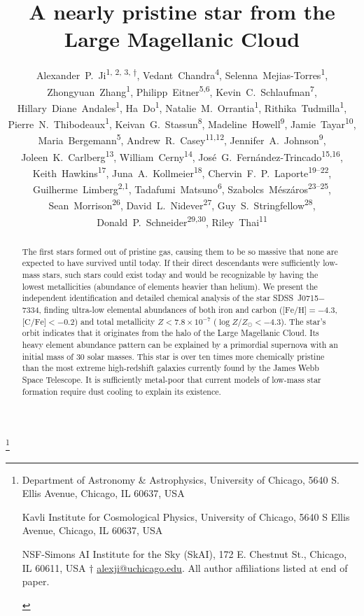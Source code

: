 \documentclass{natureprintstyle}
\title{A nearly pristine star from the Large Magellanic Cloud}
\author{Alexander~P.~Ji\textsuperscript{1, 2, 3, $\dagger$}, %
Vedant~Chandra\textsuperscript{4},                           %
Selenna~Mejias-Torres\textsuperscript{1},                    %
Zhongyuan~Zhang\textsuperscript{1},                          %
Philipp~Eitner\textsuperscript{5,6},                         %
Kevin~C.~Schlaufman\textsuperscript{7},                      %
Hillary~Diane~Andales\textsuperscript{1},                    %
Ha~Do\textsuperscript{1},                                    %
Natalie~M.~Orrantia\textsuperscript{1},                      %
Rithika~Tudmilla\textsuperscript{1},                         %
Pierre~N.~Thibodeaux\textsuperscript{1},                     %
Keivan~G.~Stassun\textsuperscript{8},                        %
Madeline~Howell\textsuperscript{9},                          %
Jamie~Tayar\textsuperscript{10},                             %
Maria~Bergemann\textsuperscript{5},                          %
Andrew~R.~Casey\textsuperscript{11,12},                      %
Jennifer~A.~Johnson\textsuperscript{9},                      %
Joleen~K.~Carlberg\textsuperscript{13},                      %
William~Cerny\textsuperscript{14},                           %
Jos\'e~G.~Fern\'andez-Trincado\textsuperscript{15,16},          %
Keith~Hawkins\textsuperscript{17},                           %
Juna~A.~Kollmeier\textsuperscript{18},                       %
Chervin~F.~P.~Laporte\textsuperscript{19--22},               %
Guilherme~Limberg\textsuperscript{2,1},                        %
Tadafumi~Matsuno\textsuperscript{6},                         %
Szabolcs~M{\'e}sz{\'a}ros\textsuperscript{23--25},           %
Sean~Morrison\textsuperscript{26},                           %
David~L.~Nidever\textsuperscript{27},                        %
Guy~S.~Stringfellow\textsuperscript{28},                     %
Donald~P.~Schneider\textsuperscript{29,30},                  %
Riley~Thai\textsuperscript{11}                               %
}
\newcommand{\logzzsun}{\ensuremath{\log Z/Z_\odot}\xspace}
\newcommand{\umpstar}{J0715$-$7334\xspace}
\begin{document}
\maketitle
\let\thefootnote\relax\footnote{

\begin{affiliations}
\item Department of Astronomy \& Astrophysics, University of Chicago, 5640 S. Ellis Avenue, Chicago, IL 60637, USA
\item Kavli Institute for Cosmological Physics, University of Chicago, 5640 S Ellis Avenue, Chicago, IL 60637, USA
\item NSF-Simons AI Institute for the Sky (SkAI), 172 E. Chestnut St., Chicago, IL 60611, USA
$\dagger$ \href{mailto:alexji@uchicago.edu}{alexji@uchicago.edu}.
All author affiliations listed at end of paper.
\end{affiliations}
}


\vspace{-3.5mm}
\begin{abstract}
The first stars formed out of pristine gas, causing them to be so massive that none are expected to have survived until today. If their direct descendants were sufficiently low-mass stars, such stars could exist today and would be recognizable by having the lowest metallicities (abundance of elements heavier than helium). We present the independent identification and detailed chemical analysis of the star SDSS~\umpstar, finding ultra-low elemental abundances of both iron and carbon ($\mbox{[Fe/H]} = -4.3$, $\mbox{[C/Fe]} < -0.2$) and total metallicity $Z < 7.8 \times 10^{-7}$ ($\logzzsun < -4.3$). The star's orbit indicates that it originates from the halo of the Large Magellanic Cloud. Its heavy element abundance pattern can be explained by a primordial supernova with an initial mass of 30 solar masses. This star is over ten times more chemically pristine than the most extreme high-redshift galaxies currently found by the James Webb Space Telescope. It is sufficiently metal-poor that current models of low-mass star formation require dust cooling to explain its existence.
\end{abstract}

\end{document}
